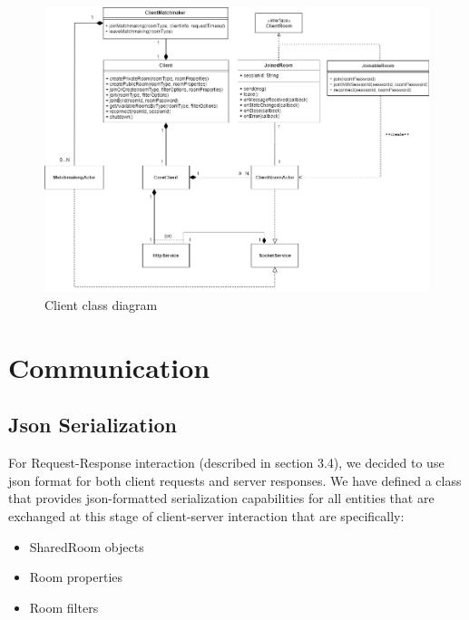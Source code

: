 \begin{figure}
	\hspace*{-1 in}
	\includegraphics[scale=0.55]{images/4-design/client_class.png}
	\caption{Client class diagram}
	\label{fig:client_class_diagram}
\end{figure}

\section{Communication}\label{sec:communication_design}


\subsection{Json Serialization}
For Request-Response interaction (described in section 3.4), we decided to use json format for both client requests and server responses. We have defined a class that provides json-formatted serialization capabilities for all entities that are exchanged at this stage of client-server interaction that are specifically:
\begin{itemize}
	\item SharedRoom objects
	\item Room properties
	\item Room filters
\end{itemize}

